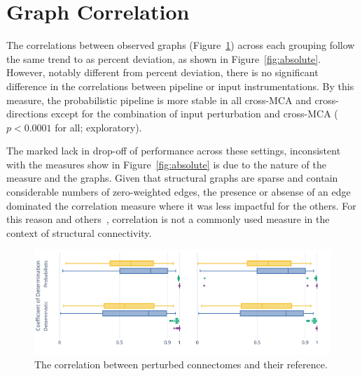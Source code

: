 \documentclass[fleqn,10pt]{SelfArx} %
\begin{document}



\beginsupplement

\clearpage
\section{Graph Correlation}
\label{supsec:correlation}
The correlations between observed graphs (Figure~\ref{fig:correlation}) across each grouping follow the same trend to
as percent deviation, as shown in Figure~\ref{fig:absolute}. However, notably different from percent deviation, there
is no significant difference in the correlations between pipeline or input instrumentations. By this measure, the
probabilistic pipeline is more stable in all cross-MCA and cross-directions except for the combination of input
perturbation and cross-MCA ($p < 0.0001$ for all; exploratory).

The marked lack in drop-off of performance across these settings, inconsistent with the measures show in
Figure~\ref{fig:absolute} is due to the nature of the measure and the graphs. Given that structural graphs are sparse
and contain considerable numbers of zero-weighted edges, the presence or absense of an edge dominated the correlation
measure where it was less impactful for the others. For this reason and others~\cite{huang2016linking}, correlation is
not a commonly used measure in the context of structural connectivity.

\begin{figure}[ht]\centering
\includegraphics[width=\linewidth]{figures/figS1_correlation_differences.pdf}
\caption{The correlation between perturbed connectomes and their reference.}
\label{fig:correlation}
\end{figure}
\end{document}
